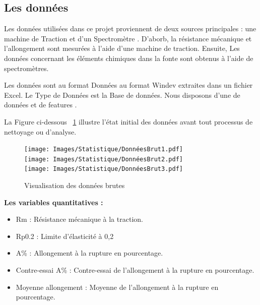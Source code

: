 \documentclass[12pt]{article}
\begin{document}
\subsection{Les données}


Les données utilisées dans ce projet proviennent de deux sources principales :
une machine de Traction et d'un Spectromètre . 
D'aborb, la résistance mécanique et l'allongement sont mesurées à l'aide d'une 
machine de traction. Ensuite, Les données concernant les éléments chimiques dans 
la fonte sont obtenus à l'aide de spectromètres.



Les données sont au format Données au format Windev extraites dans un fichier Excel.
Le Type de Données est la Base de données. Nous disposons d'une de données et de features .

La Figure ci-dessous ~\ref{fig:donnees_brutes}  illustre l'état initial des données avant tout 
processus de nettoyage ou d'analyse.


\begin{figure}[H]
    \centering
    \texttt{[image: Images/Statistique/DonnéesBrut1.pdf]} \\
    \vspace{10pt}
    \texttt{[image: Images/Statistique/DonnéesBrut2.pdf]} \\
    \vspace{10pt}
    \texttt{[image: Images/Statistique/DonnéesBrut3.pdf]}
    \caption{Visualisation des données brutes}
    \label{fig:donnees_brutes}
\end{figure}




    




    
    


\textbf{Les variables quantitatives :}

\begin{itemize}
\item Rm : Résistance mécanique à la traction.
\item Rp0.2 : Limite d'élasticité à 0,2%
\item A\% : Allongement à la rupture en pourcentage.
\item Contre-essai A\% : Contre-essai de l'allongement à la rupture en pourcentage.
\item Moyenne allongement : Moyenne de l'allongement à la rupture en pourcentage.
\end{itemize}
    
\end{document}
